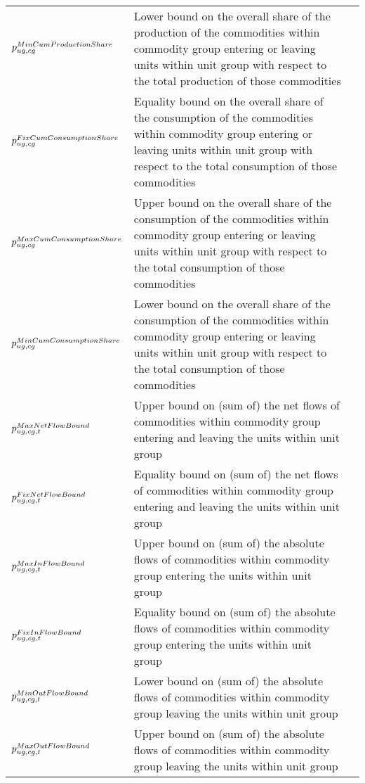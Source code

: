 \begin{longtable}{p{\cola} p{\colc} >{\small\raggedleft\arraybackslash\itshape}p{\colb}}
		$p^{MinCumProductionShare}_{ug,cg}$	& Lower bound on the overall share of the production of the commodities within commodity group \commoditygroup entering or leaving units within unit group \unitgroup with respect to the total production of those commodities	&                \\
		$p^{FixCumConsumptionShare}_{ug,cg}$	& Equality bound on the overall share of the consumption of the commodities within commodity group \commoditygroup entering or leaving units within unit group \unitgroup with respect to the total consumption of those commodities	&                \\
		$p^{MaxCumConsumptionShare}_{ug,cg}$	& Upper bound on the overall share of the consumption of the commodities within commodity group \commoditygroup entering or leaving units within unit group \unitgroup with respect to the total consumption of those commodities	&                \\
		$p^{MinCumConsumptionShare}_{ug,cg}$	& Lower bound on the overall share of the consumption of the commodities within commodity group \commoditygroup entering or leaving units within unit group \unitgroup with respect to the total consumption of those commodities	&                \\
		$p^{MaxNetFlowBound}_{ug,cg,t}$	& Upper bound on (sum of) the net flows of commodities within commodity group \commoditygroup entering and leaving the units within unit group \unitgroup 	&                \\
		$p^{FixNetFlowBound}_{ug,cg,t}$	& Equality bound on (sum of) the net flows of commodities within commodity group \commoditygroup entering and leaving the units within unit group \unitgroup 	&                \\
		$p^{MaxInFlowBound}_{ug,cg,t}$	& Upper bound on (sum of) the absolute flows of commodities within commodity group \commoditygroup entering the units within unit group \unitgroup 	&                \\
		$p^{FixInFlowBound}_{ug,cg,t}$	& Equality bound on (sum of) the absolute flows of commodities within commodity group \commoditygroup entering the units within unit group \unitgroup 	&                \\
		$p^{MinOutFlowBound}_{ug,cg,t}$	& Lower bound on (sum of) the absolute flows of commodities within commodity group \commoditygroup leaving the units within unit group \unitgroup 	&                \\
		$p^{MaxOutFlowBound}_{ug,cg,t}$	& Upper bound on (sum of) the absolute flows of commodities within commodity group \commoditygroup leaving the units within unit group \unitgroup 	&                \\

\end{longtable}
